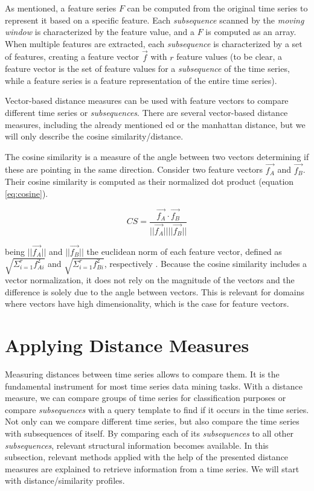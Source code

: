 As mentioned, a feature series $F$ can be computed from the original time series to represent it based on a specific feature.  Each \textit{subsequence} scanned by the \textit{moving window} is characterized by the feature value, and a $F$ is computed as an array. When multiple features are extracted, each \textit{subsequence} is characterized by a set of features, creating a feature vector $\vec{f}$ with $r$ feature values (to be clear, a feature vector is the set of feature values for a \textit{subsequence} of the time series, while a feature series is a feature representation of the entire time series). 
\par
Vector-based distance measures can be used with feature vectors to compare different time series or \textit{subsequences}. There are several vector-based distance measures, including the already mentioned \gls{ed} or the manhattan distance, but we will only describe the cosine similarity/distance.
\par
The cosine similarity is a measure of the angle between two vectors determining if these are pointing in the same direction. Consider two feature vectors $\vec{f_A}$ and $\vec{f_B}$. Their cosine similarity is computed as their normalized dot product \cite{cosine} (equation \ref{eq:cosine}).

\begin{equation}
\label{eq:cosine}
CS = \frac{\vec{f_A} \cdot \vec{f_B}}{||\vec{f_A}|| ||\vec{f_B}||}
\end{equation}

being $||\vec{f_A}||$ and $||\vec{f_B}||$ the euclidean norm of each feature vector, defined as $\sqrt{\Sigma_{i=1}^{r} f_{Ai}^2}$ and $\sqrt{\Sigma_{i=1}^{r} f_{Bi}^2}$, respectively \cite{cosine}. Because the cosine similarity includes a vector normalization, it does not rely on the magnitude of the vectors and the difference is solely due to the angle between vectors. This is relevant for domains where vectors have high dimensionality, which is the case for feature vectors.


\section{Applying Distance Measures}
\label{sec:dist_measures}

Measuring distances between time series allows to compare them. It is the fundamental instrument for most time series data mining tasks. With a distance measure, we can compare groups of time series for classification purposes or compare \textit{subsequences} with a query template to find if it occurs in the time series. Not only can we compare different time series, but also compare the time series with subsequences of itself. By comparing each of its \textit{subsequences} to all other \textit{subsequences}, relevant structural information becomes available. In this subsection, relevant methods applied with the help of the presented distance measures are explained to retrieve information from a time series. We will start with distance/similarity profiles.

